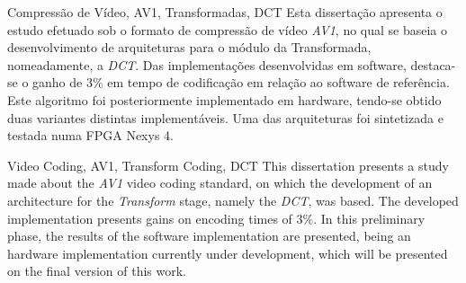 \TitlePage
  \vspace*{55mm}
       {Compressão de Vídeo, AV1, Transformadas, DCT}
       {Esta dissertação apresenta o estudo efetuado sob o formato de compressão de vídeo \emph{AV1}, no qual se baseia o desenvolvimento de arquiteturas para o módulo da Transformada, nomeadamente, a \emph{DCT}. Das implementações desenvolvidas em software, destaca-se o ganho de $3\%$ em tempo de codificação em relação ao software de referência.}
  \TEXT{}
       {Este algoritmo foi posteriormente implementado em hardware, tendo-se obtido duas variantes distintas implementáveis. Uma das arquiteturas foi sintetizada e testada numa FPGA Nexys 4.}
\EndTitlePage
\titlepage\ \endtitlepage %

\TitlePage
  \vspace*{55mm}
       {Video Coding, AV1, Transform Coding, DCT}
       {This dissertation presents a study made about the \emph{AV1} video coding standard, on which the development of an architecture for the \emph{Transform} stage, namely the \emph{DCT}, was based. The developed implementation presents gains on encoding times of $3\%$.}
  \TEXT{}
       {In this preliminary phase, the results of the software implementation are presented, being an hardware implementation currently under development, which will be presented on the final version of this work.}
\EndTitlePage
\titlepage\ \endtitlepage %
